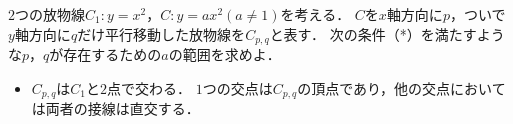 $2$つの放物線$C_1:y=x^2$，$C:y=ax^2(a\neq 1)$を考える．
$C$を$x$軸方向に$p$，ついで$y$軸方向に$q$だけ平行移動した放物線を$C_{p,q}$と表す．
次の条件（*）を満たすような$p$，$q$が存在するための$a$の範囲を求めよ．
\begin{itemize}
  \item[（*）] $C_{p,q}$は$C_1$と$2$点で交わる．
        $1$つの交点は$C_{p,q}$の頂点であり，他の交点においては両者の接線は直交する．
\end{itemize}